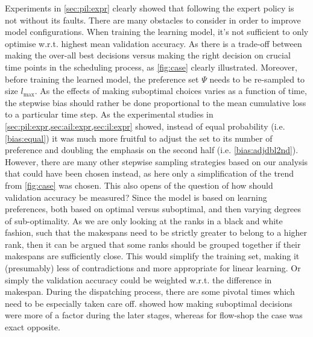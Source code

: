 \documentclass[twocolumn]{svjour3}
\begin{document}
Experiments in \cref{sec:pil:expr} clearly showed that following the expert 
policy is not without its faults. There are many obstacles to consider in order 
to improve model configurations. 
When training the learning model, it's not sufficient to only optimise w.r.t. 
highest mean validation accuracy. As there is a trade-off between making the 
over-all best decisions versus making the right decision on crucial time points 
in the scheduling process, as \cref{fig:case} clearly illustrated. 
Moreover, before training the learned model, the preference set $\Psi$ 
needs to be re-sampled to size $l_{\max}$. 
As the effects of making suboptimal choices varies as a function of time, the 
stepwise bias should rather be done proportional to the mean 
cumulative loss to a particular time step. 
As the experimental studies in \cref{sec:pil:expr,sec:ail:expr,sec:il:expr} 
showed, instead of equal probability (i.e. \ref{bias:equal}) it was much more 
fruitful to adjust the set to its number of preference and doubling the 
emphasis on the second half (i.e. \ref{bias:adjdbl2nd}).
However, there are many other stepwise sampling strategies based on our 
analysis that could have been chosen instead, as here only a 
simplification of the trend from \cref{fig:case} was chosen. 
This also opens of the question of how should validation accuracy be measured? 
Since the model is based on learning preferences, both based on optimal versus 
suboptimal, and then varying degrees of sub-optimality. As we are only looking 
at the ranks in a black and white fashion, such that the makespans need to be 
strictly greater to belong to a higher rank, then it can be argued that some 
ranks should be grouped together if their makespans are sufficiently close. 
This would simplify the training set, making it (presumably) less of 
contradictions and more appropriate for linear learning. Or simply the 
validation accuracy could be weighted w.r.t. the difference in makespan.
During the dispatching process, there are some pivotal times which need to be 
especially taken care off.  showed how making suboptimal 
decisions were more of a factor during the later stages, whereas for flow-shop 
the case was exact opposite. 
\end{document}
